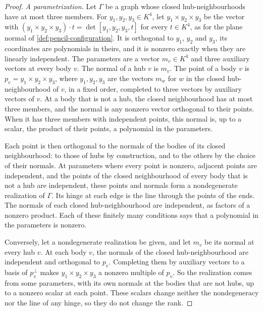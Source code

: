 \begin{proof}
  \leanok
  \emph{A parametrization.} Let $\Gamma$ be a graph whose closed
  hub-neighbourhoods have at most three members. For
  $y_1, y_2, y_3 \in K^4$, let $y_1 \times y_2 \times y_3$ be the vector
  with $(y_1 \times y_2 \times y_3) \cdot t = \det[y_1, y_2, y_3, t]$ for
  every $t \in K^4$, as for the plane normal of
  \cref{def:pencil-configuration}. It is orthogonal to $y_1$, $y_2$ and
  $y_3$, its coordinates are polynomials in theirs, and it is nonzero
  exactly when they are linearly independent.
  The parameters are a vector $m_v \in K^4$ and three auxiliary vectors at
  every body $v$. The normal of a hub $v$ is $m_v$. The point of a body $v$
  is $p_v = y_1 \times y_2 \times y_3$, where $y_1, y_2, y_3$ are the
  vectors $m_w$ for $w$ in the closed hub-neighbourhood of $v$, in a fixed
  order, completed to three vectors by auxiliary vectors of $v$. At a body
  that is not a hub, the closed neighbourhood has at most three members,
  and the normal is any nonzero vector orthogonal to their points. When it
  has three members with independent points, this normal is, up to a
  scalar, the product of their points, a polynomial in the parameters.

  Each point is then orthogonal to the normals of the bodies of its closed
  neighbourhood: to those of hubs by construction, and to the others by
  the choice of their normals. At parameters where every point is nonzero,
  adjacent points are independent, and the points of the closed
  neighbourhood of every body that is not a hub are independent, these
  points and normals form a nondegenerate realization of $\Gamma$. Its
  hinge at each edge is the line through the points of the ends. The normals of each closed
  hub-neighbourhood are independent, as factors of a nonzero product.
  Each of these finitely many conditions says that a polynomial in the
  parameters is nonzero.

  Conversely, let a nondegenerate realization be given, and let $m_v$ be
  its normal at every hub $v$. At each body $v$, the normals of the closed
  hub-neighbourhood are independent and orthogonal to $p_v$. Completing
  them by auxiliary vectors to a basis of $p_v^{\perp}$ makes
  $y_1 \times y_2 \times y_3$ a nonzero multiple of $p_v$. So the
  realization comes from some parameters, with its own normals at the
  bodies that are not hubs, up to a nonzero scalar at each point. These
  scalars change neither the nondegeneracy nor the line of any hinge, so
  they do not change the rank.


\end{proof}
